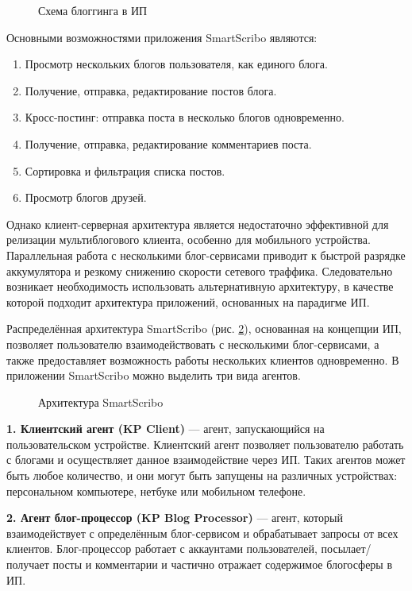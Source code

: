 \begin{figure}[h]
\centerline{
}
\caption{Схема блоггинга в ИП}
\label{concept}
\end{figure}

Основными возможностями приложения SmartScribo являются:
\begin{enumerate}
\item
Просмотр нескольких блогов пользователя, как единого блога.
\item
Получение, отправка, редактирование постов блога.
\item
Кросс-постинг: отправка поста в несколько блогов одновременно.
\item
Получение, отправка, редактирование комментариев поста.
\item
Сортировка и фильтрация списка постов.
\item
Просмотр блогов друзей.
\end{enumerate}

Однако клиент-серверная архитектура является недостаточно эффективной для релизации мультиблогового
клиента, особенно для мобильного устройства. Параллельная работа с несколькими блог-сервисами
приводит к быстрой разрядке аккумулятора и резкому снижению скорости сетевого траффика. 
Следовательно возникает необходимость использовать
альтернативную архитектуру, в качестве которой подходит архитектура приложений, основанных на парадигме ИП.

Распределённая архитектура SmartScribo (рис. \ref{scribo-architecture}),
основанная на концепции ИП, позволяет пользователю взаимодействовать с несколькими
блог-сервисами, а также предоставляет возможность работы нескольких клиентов одновременно. В приложении SmartScribo можно выделить три вида агентов.

\begin{figure}[h]
\centerline{
}
\caption{Архитектура SmartScribo}
\label{scribo-architecture}
\end{figure}

{\bf 1. Клиентский агент (KP Client)} --- агент, запускающийся на пользовательском
устройстве. Клиентский агент позволяет пользователю работать с блогами и осуществляет данное взаимодействие через ИП.
Таких агентов может быть любое количество, и они могут быть запущены на различных устройствах: персональном компьютере, нетбуке или мобильном телефоне.

{\bf 2. Агент блог-процессор (KP Blog Processor)} --- агент, который взаимодействует с определённым блог-сервисом и обрабатывает запросы от всех клиентов. 
Блог-процессор работает с аккаунтами пользователей, посылает/получает посты и комментарии и частично отражает содержимое блогосферы в ИП.

